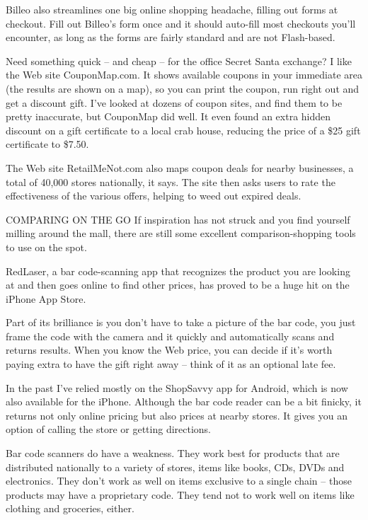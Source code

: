 ﻿\documentclass[12pt]{article}
\begin{document}
Billeo also streamlines one big online shopping headache, filling out forms at checkout. Fill out
Billeo's form once and it should auto-fill most checkouts you'll encounter, as long as the forms are
fairly standard and are not Flash-based.

Need something quick -- and cheap -- for the office Secret Santa exchange? I like the Web site
CouponMap.com. It shows available coupons in your immediate area (the results are shown on a map),
so you can print the coupon, run right out and get a discount gift. I've looked at dozens of coupon
sites, and find them to be pretty inaccurate, but CouponMap did well. It even found an extra hidden
discount on a gift certificate to a local crab house, reducing the price of a \$25 gift certificate
to \$7.50.

The Web site RetailMeNot.com also maps coupon deals for nearby businesses, a total of 40,000 stores
nationally, it says. The site then asks users to rate the effectiveness of the various offers,
helping to weed out expired deals.

COMPARING ON THE GO If inspiration has not struck and you find yourself milling around the mall,
there are still some excellent comparison-shopping tools to use on the spot.

RedLaser, a bar code-scanning app that recognizes the product you are looking at and then goes
online to find other prices, has proved to be a huge hit on the iPhone App Store.

Part of its brilliance is you don't have to take a picture of the bar code, you just frame the code
with the camera and it quickly and automatically scans and returns results. When you know the Web
price, you can decide if it's worth paying extra to have the gift right away -- think of it as an
optional late fee.

In the past I've relied mostly on the ShopSavvy app for Android, which is now also available for the
iPhone. Although the bar code reader can be a bit finicky, it returns not only online pricing but
also prices at nearby stores. It gives you an option of calling the store or getting directions.

Bar code scanners do have a weakness. They work best for products that are distributed nationally to
a variety of stores, items like books, CDs, DVDs and electronics. They don't work as well on items
exclusive to a single chain -- those products may have a proprietary code. They tend not to work
well on items like clothing and groceries, either.
\end{document}
